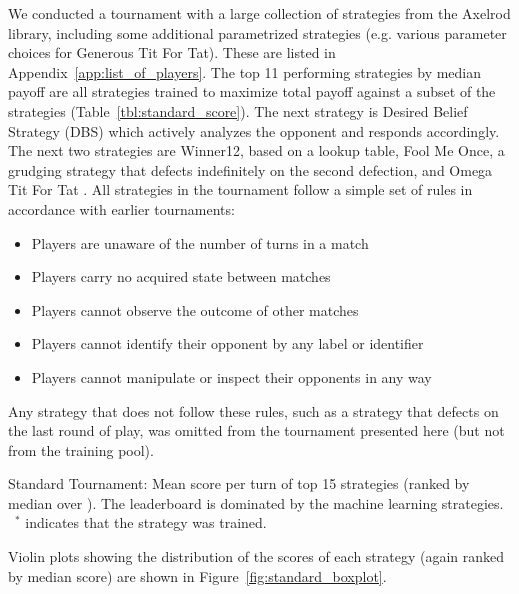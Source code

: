 \documentclass{article}
\begin{document}
We conducted a tournament with a large collection of strategies from the Axelrod
library, including some additional parametrized strategies (e.g. various parameter
choices for Generous Tit For Tat). These are listed in
Appendix~\ref{app:list_of_players}.
The top 11 performing strategies by median payoff are all strategies trained to maximize
total payoff against a subset of the strategies (Table~\ref{tbl:standard_score}).
The next strategy is Desired Belief Strategy (DBS)
which actively analyzes the opponent and responds
accordingly. The next two strategies are Winner12, based on a lookup table,
Fool Me Once, a grudging strategy that defects indefinitely on
the second defection, and Omega Tit For Tat \cite{Slany2007}.
All strategies in the tournament follow a simple set of
rules in accordance with earlier tournaments:

\begin{itemize}
  \item Players are unaware of the number of turns in a match
  \item Players carry no acquired state between matches
  \item Players cannot observe the outcome of other matches
  \item Players cannot identify their opponent by any label or identifier
  \item Players cannot manipulate or inspect their opponents in any way
\end{itemize}

Any strategy that does not follow these rules, such as a strategy that defects
on the last round of play, was omitted from the tournament presented here (but
not from the training pool).

\begin{table}[!hbtp]
        \centering
        
        \caption{Standard Tournament: Mean score per turn of top 15 strategies
            (ranked by median over
        \protecttournaments).
        The leaderboard is dominated by the machine learning strategies. ~$^{*}$
        indicates that the strategy was trained.}
        \label{tbl:standard_score}
\end{table}

Violin plots showing the distribution of the scores of each strategy (again
ranked by median score) are shown in Figure~\ref{fig:standard_boxplot}.
\end{document}
